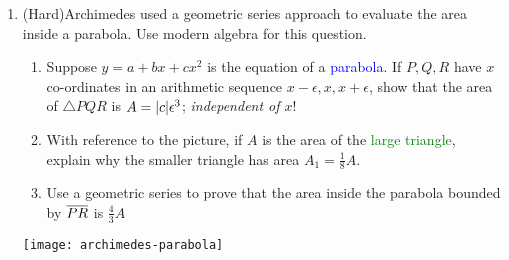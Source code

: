 \begin{exercises}
\begin{enumerate}
	 	\item (Hard)\lstsp Archimedes used a geometric series approach to evaluate the area inside a parabola. Use modern algebra for this question.\par
	 	\begin{minipage}[t]{0.6\linewidth}\vspace{-5pt}
	 	 	\begin{enumerate}
	  		\item Suppose $y=a+bx+cx^2$ is the equation of a \textcolor{blue}{parabola}. If $P,Q,R$ have $x$ co-ordinates in an arithmetic sequence $x-\epsilon,x,x+\epsilon$, show that the area of $\triangle PQR$ is $A=\left| c\right|\!\epsilon^3$; \emph{independent of $x$}!
	  		\item With reference to the picture, if $A$ is the area of the \textcolor{Green}{large triangle}, explain why the smaller triangle has area $A_1=\frac 18A$.
	  		\item Use a geometric series to prove that the area inside the parabola bounded by $\overline{PR}$ is $\frac 43A$
	 		\end{enumerate}
	 	\end{minipage}
	 	\hfill
	 	\begin{minipage}[t]{0.39\linewidth}\vspace{-5pt}
	 		\flushright
	 		\texttt{[image: archimedes-parabola]}
	 	\end{minipage}
	
	\end{enumerate}
\end{exercises}






